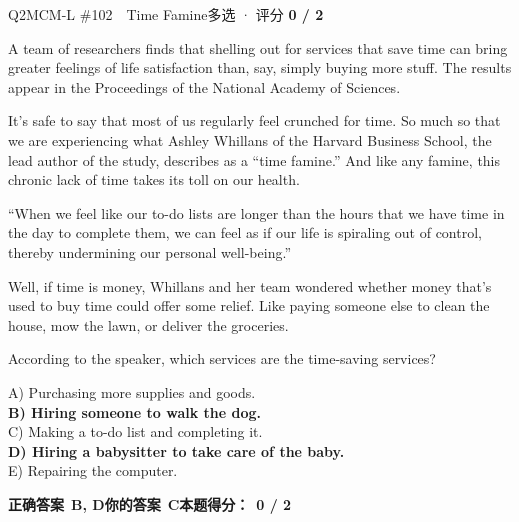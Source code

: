 \begin{qblock}{Q2\quad MCM-L \#102\ \ Time Famine}{多选 · 评分 \textcolor{cAccent}{\bfseries 0 / 2}}
\begin{promptbox}
A team of researchers finds that shelling out for services that save time can bring greater feelings of life satisfaction than, say, simply buying more stuff. The results appear in the Proceedings of the National Academy of Sciences.

It's safe to say that most of us regularly feel crunched for time. So much so that we are experiencing what Ashley Whillans of the Harvard Business School, the lead author of the study, describes as a ``time famine.'' And like any famine, this chronic lack of time takes its toll on our health.

``When we feel like our to-do lists are longer than the hours that we have time in the day to complete them, we can feel as if our life is spiraling out of control, thereby undermining our personal well-being.''

Well, if time is money, Whillans and her team wondered whether money that's used to buy time could offer some relief. Like paying someone else to clean the house, mow the lawn, or deliver the groceries.
\end{promptbox}
\begin{notebox}According to the speaker, which services are the time-saving services?\end{notebox}
{\small
A) Purchasing more supplies and goods.\\
{\color{cFix}\textbf{B) Hiring someone to walk the dog.}}\\
C) Making a to-do list and completing it.\\
{\color{cFix}\textbf{D) Hiring a babysitter to take care of the baby.}}\\
E) Repairing the computer.}
\par\smallskip
\textbf{正确答案}\ \textcolor{cFix}{\bfseries B, D}\qquad\textbf{你的答案}\ {\color{cWrong}\bfseries C}\qquad\textbf{本题得分：}\ {\color{cAccent}\bfseries 0 / 2}
\end{qblock}

